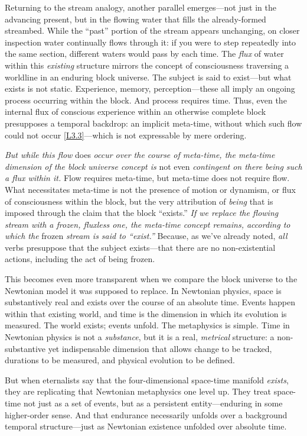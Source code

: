 \documentclass[12pt]{book}
\newcounter{logicanchor}
\newenvironment{logicanchorenv}[1]{\refstepcounter{logicanchor}\label{#1}}{}
\newcommand{\logiclink}[2]{\begin{logicanchorenv}{logic:#1}\end{logicanchorenv}\hyperref[appendix:#1]{[#1]}\xspace}
\begin{document}
Returning to the stream analogy, another parallel emerges---not just in the advancing present, but in the flowing water that fills the already-formed streambed. While the ``past'' portion of the stream appears unchanging, on closer inspection water continually flows through it: if you were to step repeatedly into the same section, different waters would pass by each time. The \textit{flux} of water within this \textit{existing} structure mirrors the concept of consciousness traversing a worldline in an enduring block universe. The subject is said to exist---but what exists is not static. Experience, memory, perception---these all imply an ongoing process occurring within the block. And process requires time. Thus, even the internal flux of conscious experience within an otherwise complete block presupposes a temporal backdrop: an implicit meta-time, without which such flow could not occur \logiclink{L3.3}{}---which is not expressable by mere ordering.

\textit{But while this flow} does \textit{occur over the course of meta-time, the meta-time dimension of the block universe concept is} not even \textit{contingent on there being such a flux within it.} Flow requires meta-time, but meta-time does not require flow. What necessitates meta-time is not the presence of motion or dynamism, or flux of consciousness within the block, but the very attribution of \textit{being} that is imposed through the claim that the block ``exists.'' \textit{If we replace the flowing stream with a frozen, fluxless one, the meta-time concept remains, according to which the} frozen \textit{stream is said to ``exist.''} Because, as we've already noted, \textit{all} verbs presuppose that the subject exists---that there are no non-existential actions, including the act of being frozen.

This becomes even more transparent when we compare the block universe to the Newtonian model it was supposed to replace. In Newtonian physics, space is substantively real and exists over the course of an absolute time. Events happen within that existing world, and time is the dimension in which its evolution is measured. The world exists; events unfold. The metaphysics is simple. Time in Newtonian physics is not a \textit{substance}, but it is a real, \textit{metrical} structure: a non-substantive yet indispensable dimension that allows change to be tracked, durations to be measured, and physical evolution to be defined.

But when eternalists say that the four-dimensional space-time manifold \textit{exists}, they are replicating that Newtonian metaphysics one level up. They treat space-time not just as a set of events, but as a persistent entity---enduring in some higher-order sense. And that endurance necessarily unfolds over a background temporal structure---just as Newtonian existence unfolded over absolute time.
\end{document}
